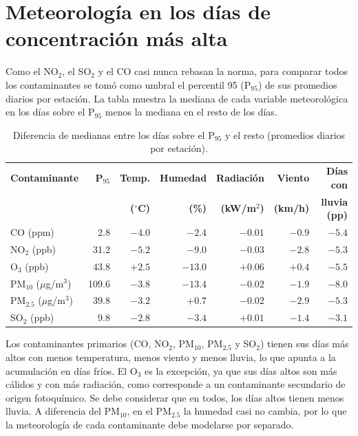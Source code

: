 \documentclass[11pt]{article}
\begin{document}
\section{Meteorología en los días de concentración más alta}
\label{anexo:p95}
Como el NO$_2$, el SO$_2$ y el CO casi nunca rebasan la norma, para comparar todos los contaminantes se tomó como umbral el percentil 95 (P$_{95}$) de sus promedios diarios por estación. La tabla muestra la mediana de cada variable meteorológica en los días sobre el P$_{95}$ menos la mediana en el resto de los días.
\begin{table}[H]
\centering
\small
\caption{Diferencia de medianas entre los días sobre el P$_{95}$ y el resto (promedios diarios por estación).}
\vspace{5pt}
\begin{tabular}{lrrrrrr}
\toprule
\textbf{Contaminante} & \textbf{P$_{95}$} & \textbf{Temp.} & \textbf{Humedad} & \textbf{Radiación} & \textbf{Viento} & \textbf{Días con} \\
 & & \textbf{($^\circ$C)} & \textbf{(\%)} & \textbf{(kW/m$^2$)} & \textbf{(km/h)} & \textbf{lluvia (pp)} \\
\midrule
CO (ppm) & 2.8 & $-4.0$ & $-2.4$ & $-0.01$ & $-0.9$ & $-5.4$ \\
NO$_2$ (ppb) & 31.2 & $-5.2$ & $-9.0$ & $-0.03$ & $-2.8$ & $-5.3$ \\
O$_3$ (ppb) & 43.8 & $+2.5$ & $-13.0$ & $+0.06$ & $+0.4$ & $-5.5$ \\
PM$_{10}$ ($\mu$g/m$^3$) & 109.6 & $-3.8$ & $-13.4$ & $-0.02$ & $-1.9$ & $-8.0$ \\
PM$_{2.5}$ ($\mu$g/m$^3$) & 39.8 & $-3.2$ & $+0.7$ & $-0.02$ & $-2.9$ & $-5.3$ \\
SO$_2$ (ppb) & 9.8 & $-2.8$ & $-3.4$ & $+0.01$ & $-1.4$ & $-3.1$ \\
\bottomrule
\end{tabular}
\end{table}
Los contaminantes primarios (CO, NO$_2$, PM$_{10}$, PM$_{2.5}$ y SO$_2$) tienen sus días más altos con menos temperatura, menos viento y menos lluvia, lo que apunta a la acumulación en días fríos. El O$_3$ es la excepción, ya que sus días altos son más cálidos y con más radiación, como corresponde a un contaminante secundario de origen fotoquímico. Se debe considerar que en todos, los días altos tienen menos lluvia. A diferencia del PM$_{10}$, en el PM$_{2.5}$ la humedad casi no cambia, por lo que la meteorología de cada contaminante debe modelarse por separado.
 
\end{document}
